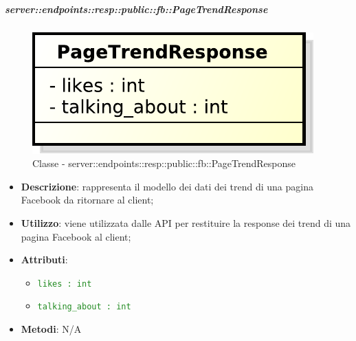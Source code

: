     \subparagraph{server::endpoints::resp::public::fb::PageTrendResponse} %
    \label{subp:bdsm_app_server_endpoints_resp_public_fb_pagetrendresponse}
  \begin{figure}[!htbp]
    \centering
    \centerline{\includegraphics[scale=0.6]{./images/server/classes/endpoints/fb/page_trend_response.pdf}}
    \caption{Classe - server::endpoints::resp::public::fb::PageTrendResponse}
  \end{figure}
    \begin{itemize}
      \item \textbf{Descrizione}: rappresenta il modello dei dati dei trend di una pagina Facebook da ritornare al client;
      \item \textbf{Utilizzo}: viene utilizzata dalle API per restituire la response dei trend di una pagina Facebook al client;
    \item \textbf{Attributi}:
      \begin{itemize}
        \item \textcolor{forestgreen}{\texttt{likes : int}}
        \item \textcolor{forestgreen}{\texttt{talking\_about : int}}
      \end{itemize}
    \item \textbf{Metodi}: N/A
    \end{itemize}


